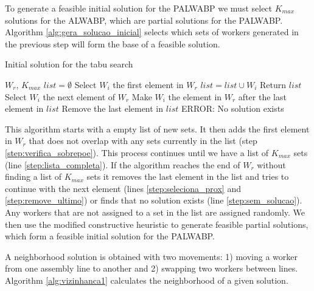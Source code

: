 \documentclass{singlecol-new}
\begin{document}
To generate a feasible initial solution for the PALWABP we must select $K_{max}$ solutions for the ALWABP, which are partial solutions for the PALWABP. Algorithm \ref{alg:gera_solucao_inicial} selects which sets of workers generated in the previous step will form the base of a feasible solution.

\begin{algorithm}[!ht]
\caption{Initial solution for the tabu search}
\label{alg:gera_solucao_inicial}
\begin{algorithmic}[1]
\REQUIRE $W_r$, $K_{max}$
\STATE $list = \emptyset$
\STATE Select $W_i$ the first element in $W_r$
	\label{step:verifica_sobrepoe}
		\STATE $list = list \cup {W_i}$
	\ENDIF
		\STATE Return $list$\label{step:lista_completa}
	\ELSE
			\STATE Select $W_i$ the next element of $W_r$
		\ELSE 
				\STATE Make $W_i$ the element in $W_r$ after the last element in $list$\label{step:seleciona_prox}
				\STATE Remove the last element in $list$\label{step:remove_ultimo}
			\ELSE 
				\STATE ERROR: No solution exists\label{step:sem_solucao}
			\ENDIF
		\ENDIF
	\ENDIF
\ENDWHILE
\end{algorithmic}
\end{algorithm}

This algorithm starts with a empty list of new sets. It then adds the first element in $W_r$ that does not overlap with any sets currently in the list (step \ref{step:verifica_sobrepoe}). This process continues until we have a list of $K_{max}$ sets (line \ref{step:lista_completa}). If the algorithm reaches the end of $W_r$ without finding a list of $K_{max}$ sets it removes the last element in the list and tries to continue with the next element (lines \ref{step:seleciona_prox} and \ref{step:remove_ultimo}) or finds that no solution exists (line \ref{step:sem_solucao}). Any workers that are not assigned to a set in the list are assigned randomly. We then use the modified constructive heuristic to generate feasible partial solutions, which form a feasible initial solution for the PALWABP.

A neighborhood solution is obtained with two movements: 1) moving a worker from one assembly line to another and 2) swapping two workers between lines. Algorithm \ref{alg:vizinhanca1} calculates the neighborhood of a given solution.
\end{document}
